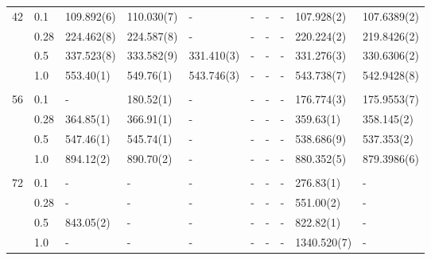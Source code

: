 {\begin{landscape}
\begin{table}
\begin{tabularx}{\hsize}{l:l|R{2.45cm}R{2.45cm}R{2.45cm}R{2.45cm}R{2.45cm}R{2.45cm}R{2.45cm}R{2.45cm}}
		42 & 0.1 & 109.892(6) & 110.030(7) & - & - & - & - &  107.928(2) & 107.6389(2) \\ 
		& 0.28 & 224.462(8) & 224.587(8) & - & - & - & - & 220.224(2) & 219.8426(2) \\
		& 0.5 & 337.523(8) & 333.582(9) & 331.410(3) & - & - & - & 331.276(3) & 330.6306(2) \\
		& 1.0 & 553.40(1) & 549.76(1) & 543.746(3) & - & - & - & 543.738(7) & 542.9428(8) \\ \hdashline \\
		
		56 & 0.1 & - & 180.52(1) & - & - & - & - & 176.774(3) & 175.9553(7) \\ 
		& 0.28 & 364.85(1) & 366.91(1) & - & - & - & - & 359.63(1) & 358.145(2) \\
		& 0.5 & 547.46(1) & 545.74(1) & - & - & - & - & 538.686(9) & 537.353(2) \\
		& 1.0 & 894.12(2) & 890.70(2) & - & - & - & - & 880.352(5) & 879.3986(6) \\ \hdashline \\
		
		72 & 0.1 & - & - & - & - & - & - & 276.83(1) & - \\ 
		& 0.28 & - & - & - & - & - & - & 551.00(2) & - \\
		& 0.5 & 843.05(2) & - & - & - & - & - & 822.82(1) & - \\
		& 1.0 & - & - & - & - & - & - & 1340.520(7) & - \\ \hline\hline
	\end{tabularx}
\end{table}


\end{landscape}}

